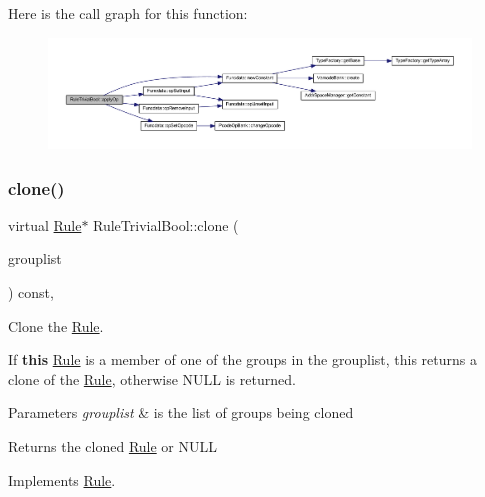 Here is the call graph for this function\+:
\nopagebreak
\begin{figure}[H]
\begin{center}
\leavevmode
\includegraphics[width=350pt]{class_rule_trivial_bool_a0254986d799ca6fd09ecb6e96288eae1_cgraph}
\end{center}
\end{figure}
\mbox{\label{class_rule_trivial_bool_a889c0573c7bc1c1d231ec03bd58a13c0}} 
\subsubsection{\texorpdfstring{clone()}{clone()}}
{\footnotesize\ttfamily virtual \mbox{\hyperlink{class_rule}{Rule}}$\ast$ Rule\+Trivial\+Bool\+::clone (\begin{DoxyParamCaption}\item[{const \mbox{\hyperlink{class_action_group_list}{Action\+Group\+List}} \&}]{grouplist }\end{DoxyParamCaption}) const\hspace{0.3cm}{\ttfamily [inline]}, {\ttfamily [virtual]}}



Clone the \mbox{\hyperlink{class_rule}{Rule}}. 

If {\bfseries{this}} \mbox{\hyperlink{class_rule}{Rule}} is a member of one of the groups in the grouplist, this returns a clone of the \mbox{\hyperlink{class_rule}{Rule}}, otherwise N\+U\+LL is returned. 
\begin{DoxyParams}{Parameters}
{\em grouplist} & is the list of groups being cloned \\
\hline
\end{DoxyParams}
\begin{DoxyReturn}{Returns}
the cloned \mbox{\hyperlink{class_rule}{Rule}} or N\+U\+LL 
\end{DoxyReturn}


Implements \mbox{\hyperlink{class_rule_a70de90a76461bfa7ea0b575ce3c11e4d}{Rule}}.



